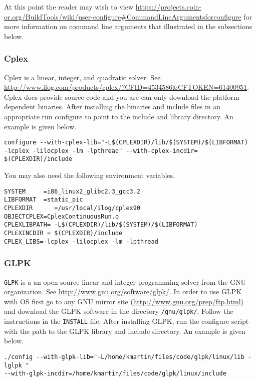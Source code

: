 \documentclass[11pt]{article}
\renewcommand{\_}{{\char"5F}}
\renewcommand{\{}{{\char"7B}}
\renewcommand{\}}{{\char"7D}}
\renewcommand{\^}{{\char"0D}}
\renewcommand{\'}{{\char"0D}}
\begin{document}
At this point the reader may wish to view  \url{https://projects.coin-or.org/BuildTools/wiki/user-configure#CommandLineArgumentsforconfigure} for more information on command line arguments that illustrated in the subsections below.


\subsubsection{Cplex}

Cplex is a linear, integer, and quadratic solver. See \url{http://www.ilog.com/products/cplex/?CFID=4534586&CFTOKEN=61400951}.  Cplex does provide source code and you are can only download the platform dependent binaries. After installing the binaries and include files in an appropriate run configure to point to the include and library directory. An example is given below.

\begin{verbatim}
configure --with-cplex-lib="-L$(CPLEXDIR)/lib/$(SYSTEM)/$(LIBFORMAT) 
-lcplex -lilocplex -lm -lpthread" --with-cplex-incdir= $(CPLEXDIR)/include
\end{verbatim}

You may also need the following environment variables.
\begin{verbatim}
SYSTEM     =i86_linux2_glibc2.3_gcc3.2
LIBFORMAT  =static_pic
CPLEXDIR      =/usr/local/ilog/cplex90
OBJECTCPLEX=CplexContinuousRun.o
CPLEXLIBPATH= -L$(CPLEXDIR)/lib/$(SYSTEM)/$(LIBFORMAT)
CPLEXINCDIR = $(CPLEXDIR)/include
CPLEX_LIBS=-lcplex -lilocplex -lm -lpthread
\end{verbatim}

\subsubsection{GLPK}

{\tt GLPK} is a an open-source linear and integer-programming solver from the GNU organization. See \url{http://www.gnu.org/software/glpk/}.  In order to use GLPK with OS first go to any GNU mirror site (\url{http://www.gnu.org/prep/ftp.html}) and download the GLPK software in the directory {\tt /gnu/glpk/}. Follow the instructions in the {\tt INSTALL} file. After installing GLPK, run the configure script with the path to the GLPK library and include directory. An example is given below.

\begin{verbatim}
./config --with-glpk-lib="-L/home/kmartin/files/code/glpk/linux/lib -lglpk " 
--with-glpk-incdir=/home/kmartin/files/code/glpk/linux/include
\end{verbatim}
\end{document}
